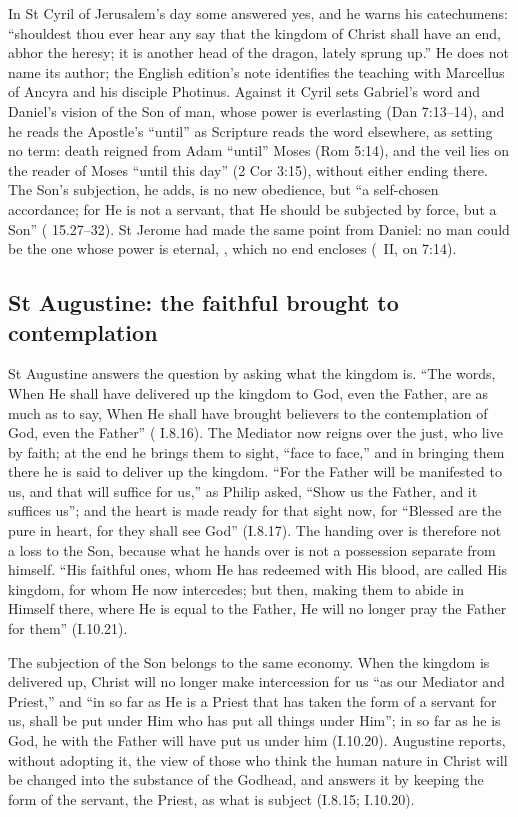 In St Cyril of Jerusalem's day some answered yes, and he warns his
catechumens: ``shouldest thou ever hear any say that the kingdom of Christ
shall have an end, abhor the heresy; it is another head of the dragon, lately
sprung up.'' He does not name its author; the English edition's note
identifies the teaching with Marcellus of Ancyra and his disciple Photinus.
Against it Cyril sets Gabriel's word and Daniel's vision of the Son of man,
whose power is everlasting (Dan 7:13--14), and he reads the Apostle's ``until''
as Scripture reads the word elsewhere, as setting no term: death reigned from
Adam ``until'' Moses (Rom 5:14), and the veil lies on the reader of Moses
``until this day'' (2 Cor 3:15), without either ending there. The Son's
subjection, he adds, is no new obedience, but ``a self-chosen accordance; for He
is not a servant, that He should be subjected by force, but a Son''
( 15.27--32). St Jerome had made the same point
from Daniel: no man could be the one whose power is eternal, , which no end encloses (\ II, on 7:14).

\subsection{St Augustine: the faithful brought to contemplation}
\label{sec:handed-augustine}

St Augustine answers the question by asking what the kingdom is. ``The words,
When He shall have delivered up the kingdom to God, even the Father, are as
much as to say, When He shall have brought believers to the contemplation of
God, even the Father'' ( I.8.16). The Mediator now reigns
over the just, who live by faith; at the end he brings them to sight, ``face to
face,'' and in bringing them there he is said to deliver up the kingdom. ``For
the Father will be manifested to us, and that will suffice for us,'' as Philip
asked, ``Show us the Father, and it suffices us''; and the heart is made ready
for that sight now, for ``Blessed are the pure in heart, for they shall see God''
(I.8.17). The handing over is therefore not a loss to the Son, because what he
hands over is not a possession separate from himself. ``His faithful ones,
whom He has redeemed with His blood, are called His kingdom, for whom He now
intercedes; but then, making them to abide in Himself there, where He is
equal to the Father, He will no longer pray the Father for them'' (I.10.21).

The subjection of the Son belongs to the same economy. When the kingdom is
delivered up, Christ will no longer make intercession for us ``as our Mediator
and Priest,'' and ``in so far as He is a Priest that has taken the form of a
servant for us, shall be put under Him who has put all things under Him''; in
so far as he is God, he with the Father will have put us under him (I.10.20).
Augustine reports, without adopting it, the view of those who think the human
nature in Christ will be changed into the substance of the Godhead, and
answers it by keeping the form of the servant, the Priest, as what is subject
(I.8.15; I.10.20).

